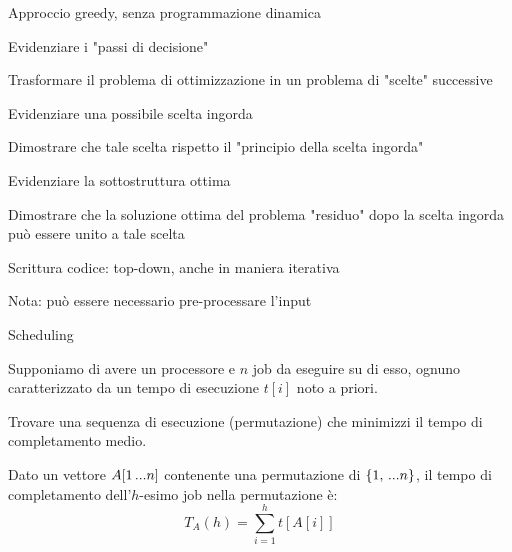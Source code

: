 \begin{frame}{Approccio greedy, senza programmazione dinamica}


\BIL
\item \alert{Evidenziare i "passi di decisione"}
\BI
\item Trasformare il problema di ottimizzazione in un problema di "scelte" successive
\EI

\item \alert{Evidenziare una possibile scelta ingorda}
\BI
\item Dimostrare che tale scelta rispetto il "principio della scelta ingorda"
\EI

\item \alert{Evidenziare la sottostruttura ottima}
\BI
\item Dimostrare che la soluzione ottima del problema "residuo" dopo la scelta ingorda può essere unito a tale scelta
\EI

\item \alert{Scrittura codice: top-down, anche in maniera iterativa}
\BI
\item Nota: può essere necessario pre-processare l'input
\EI
\EIL
\end{frame}



\begin{frame}{Scheduling}

\vspace{-6pt}
\begin{myboxtitle}[Input]
	
Supponiamo di avere un processore e $n$ job da eseguire su di esso,
ognuno caratterizzato da un tempo di esecuzione $t[i]$ noto a priori.
\end{myboxtitle}

\begin{myboxtitle}[Problema]
Trovare una sequenza di esecuzione (permutazione) che minimizzi il \alert{tempo di completamento medio}.
\end{myboxtitle}

\begin{myboxtitle}

Dato un vettore $A[1 \mydots n]$ contenente una	permutazione di $\{ 1, \mydots n \}$,
il \alert{tempo di completamento} dell'$h$-esimo job nella permutazione è:
\[
  T_A(h) = \sum_{i=1}^h t[A[i]]
\] 
\end{myboxtitle}

\end{frame}	

